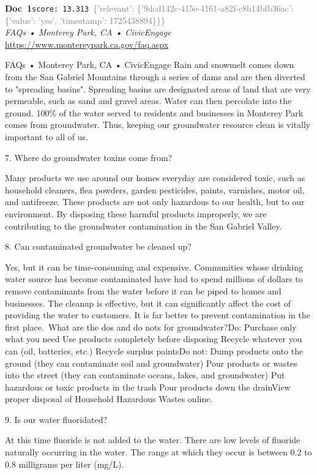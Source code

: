 \documentclass[a4paper,11pt]{article}
\begin{document}
\begin{docenv}
{\footnotesize\textcolor{doccolor}{\textbf{Doc~1}}}\hfill{\tiny\texttt{score:~13.313}}\ {\tiny\textcolor{gray}{\{'relevant': \{'9dcd142c-415e-4161-a82f-c8b14bfb36ac': \{'value': 'yes', 'timestamp': 1725438894\}\}\}}}\\[3pt]
{\small\textit{FAQs • Monterey Park, CA • CivicEngage}}\\[2pt]
{\tiny\url{https://www.montereypark.ca.gov/faq.aspx}}\\[4pt]
{\footnotesize FAQs • Monterey Park, CA • CivicEngage
Rain and snowmelt comes down from the San Gabriel Mountains through a series of dams and are then diverted to "spreading basins". Spreading basins are designated areas of land that are very permeable, such as sand and gravel areas. Water can then percolate into the ground. 100\% of the water served to residents and businesses in Monterey Park comes from groundwater. Thus, keeping our groundwater resource clean is vitally important to all of us. 	

7.
Where do groundwater toxins come from?

Many products we use around our homes everyday are considered toxic, such as household cleaners, flea powders, garden pesticides, paints, varnishes, motor oil, and antifreeze. These products are not only hazardous to our health, but to our environment. By disposing these harmful products improperly, we are contributing to the groundwater contamination in the San Gabriel Valley.	

8.
Can contaminated groundwater be cleaned up?

Yes, but it can be time-consuming and expensive. Communities whose drinking water source has become contaminated have had to spend millions of dollars to remove contaminants from the water before it can be piped to homes and businesses. The cleanup is effective, but it can significantly affect the cost of providing the water to customers. It is far better to prevent contamination in the first place. What are the dos and do nots for groundwater?Do: Purchase only what you need Use products completely before disposing Recycle whatever you can (oil, batteries, etc.) Recycle surplus paintsDo not: Dump products onto the ground (they can contaminate soil and groundwater) Pour products or wastes into the street (they can contaminate oceans, lakes, and groundwater) Put hazardous or toxic products in the trash Pour products down the drainView proper disposal of Household Hazardous Wastes online. 

9.
Is our water fluoridated?

At this time fluoride is not added to the water. There are low levels of fluoride naturally occurring in the water. The range at which they occur is between 0.2 to 0.8 milligrams per liter (mg/L).}
\end{docenv}
\end{document}
